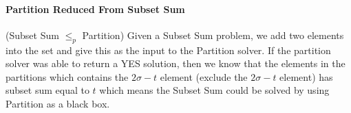 \documentclass[10pt]{article}
\begin{document}
\paragraph{Partition Reduced From Subset Sum} (Subset Sum $\leq_p$ Partition) Given a Subset Sum problem, we add two elements into the set and give this as the input to the Partition solver. If the partition solver was able to return a YES solution, then we know that the elements in the partitions which 
contains the $2\sigma - t$ element (exclude the $2\sigma - t$ element) has subset sum equal to $t$ which means the Subset Sum could be solved by using Partition as a black box. 
\end{document}

